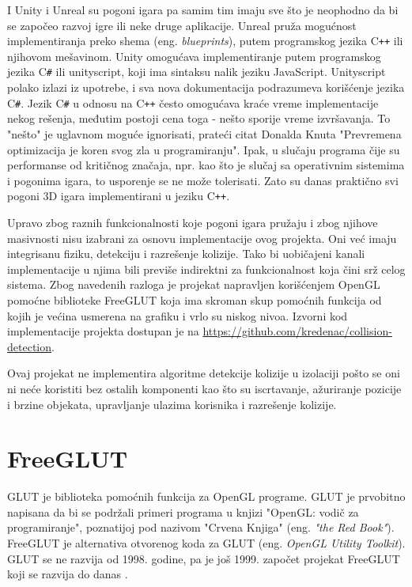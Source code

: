 \documentclass[12pt,oneside]{memoir}
\begin{document}
I Unity i Unreal su pogoni igara pa samim tim imaju sve što je neophodno da 
bi se započeo razvoj igre ili neke druge aplikacije.
Unreal pruža mogućnost implementiranja preko shema (eng. {\em blueprints}),
putem programskog jezika C\texttt{++} ili njihovom mešavinom.
Unity omogućava implementiranje putem programskog jezika C\texttt{\#} ili unityscript,
koji ima sintaksu nalik jeziku JavaScript. Unityscript polako izlazi iz upotrebe, i 
sva nova dokumentacija podrazumeva korišćenje jezika C\texttt{\#}.
Jezik C\texttt{\#} u odnosu na C\texttt{++} često omogućava kraće vreme implementacije nekog rešenja,
međutim postoji cena toga - nešto sporije vreme izvršavanja.
To "nešto" je uglavnom moguće ignorisati, prateći citat Donalda Knuta 
"Prevremena optimizacija je koren svog zla u programiranju".
Ipak, u slučaju programa čije su performanse od kritičnog značaja, npr. kao što je 
slučaj sa operativnim sistemima i pogonima igara, to usporenje se ne može tolerisati.
Zato su danas praktično svi pogoni 3D igara implementirani u jeziku C\texttt{++}.

Upravo zbog raznih funkcionalnosti koje pogoni igara pružaju i zbog njihove masivnosti nisu izabrani
za osnovu implementacije ovog projekta. Oni već imaju integrisanu fiziku, detekciju 
i razrešenje kolizije. Tako bi uobičajeni kanali implementacije u njima 
bili previše indirektni za funkcionalnost koja čini srž celog sistema.
Zbog navedenih razloga je projekat  napravljen korišćenjem OpenGL pomoćne 
biblioteke FreeGLUT  koja ima skroman skup pomoćnih
funkcija od kojih je većina usmerena na grafiku i vrlo su niskog nivoa.
Izvorni kod implementacije projekta dostupan je na \url{https://github.com/kredenac/collision-detection}.

Ovaj projekat ne implementira algoritme detekcije kolizije u izolaciji pošto 
se oni ni neće koristiti bez ostalih komponenti kao što su iscrtavanje, ažuriranje pozicije i brzine objekata,
upravljanje ulazima korisnika i razrešenje kolizije.

\section{FreeGLUT}

GLUT je biblioteka pomoćnih funkcija za OpenGL programe.
GLUT je prvobitno napisana da bi se podržali primeri programa u knjizi "OpenGL:
vodič za programiranje", poznatijoj pod nazivom "Crvena Knjiga" (eng. {\em "the Red Book"}).
FreeGLUT je alternativa otvorenog koda za GLUT (eng. {\em OpenGL Utility Toolkit}). 
GLUT se ne razvija od 1998. godine, pa je još 1999. započet projekat FreeGLUT  koji 
se razvija do danas \cite{freeglut}. 
\end{document}
